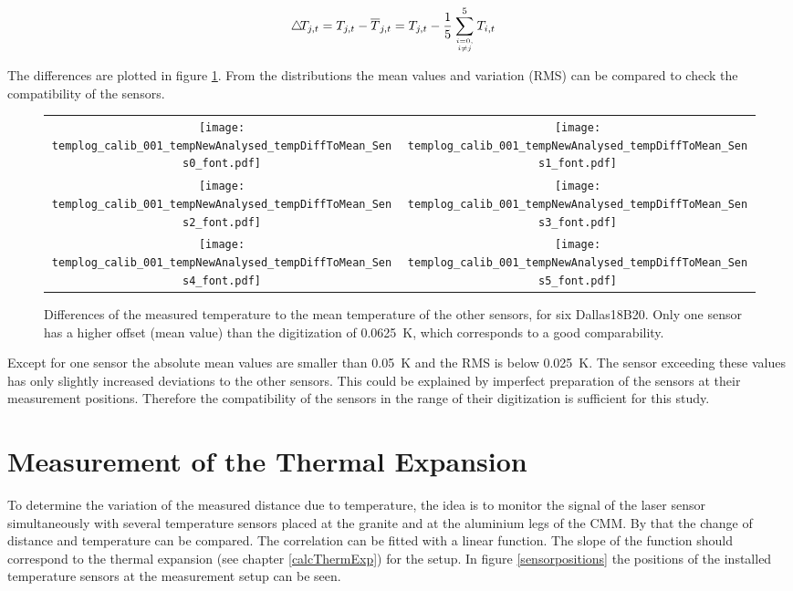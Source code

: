 \documentclass[
a4paper,                                %
twoside,                                %
BCOR1.4cm,                      %
10pt,                           %
headings=normal,                %
headsepline,                    %
clearplainpage, %
final,                                  %
div=14,
parskip=full,
openright,
bibliography=toc
]{scrreprt}
\begin{document}
\begin{align}
	\bigtriangleup\!T_{j,t} &= T_{j,t} - \overline{T}_{j,t} = T_{j,t} - \dfrac{1}{5}\sum_{i=0 ,\atop i\ne j}^{5} T_{i,t}
\end{align}

The differences are plotted in figure \ref{temphists}. From the distributions the mean values and variation (RMS) can be compared to check the compatibility of the sensors.

\begin{figure}[H]
	\begin{tabular}{cc}
		\texttt{[image: templog\_calib\_001\_tempNewAnalysed\_tempDiffToMean\_Sens0\_font.pdf]}
		&
		\texttt{[image: templog\_calib\_001\_tempNewAnalysed\_tempDiffToMean\_Sens1\_font.pdf]}
		\\
		\texttt{[image: templog\_calib\_001\_tempNewAnalysed\_tempDiffToMean\_Sens2\_font.pdf]}
		&
		\texttt{[image: templog\_calib\_001\_tempNewAnalysed\_tempDiffToMean\_Sens3\_font.pdf]}
		\\
		\texttt{[image: templog\_calib\_001\_tempNewAnalysed\_tempDiffToMean\_Sens4\_font.pdf]}
		&
		\texttt{[image: templog\_calib\_001\_tempNewAnalysed\_tempDiffToMean\_Sens5\_font.pdf]}
	\end{tabular}
	\caption{Differences of the measured temperature to the mean temperature of the other sensors, for six Dallas18B20. Only one sensor has a higher offset (mean value) than the digitization of \SI{0.0625}{K}, which corresponds to a good comparability.}
	\label{temphists}
\end{figure}

Except for one sensor the absolute mean values are smaller than \SI{0.05}{\K} and the RMS is below \SI{0.025}{\K}. The sensor exceeding these values has only slightly increased deviations to the other sensors. This could be explained by imperfect preparation of the sensors at their measurement positions. Therefore the compatibility of the sensors in the range of their digitization is sufficient for this study.

\newpage

\section{Measurement of the Thermal Expansion}

To determine the variation of the measured distance due to temperature, the idea is to monitor the signal of the laser sensor simultaneously with several temperature sensors placed at the granite and at the aluminium legs of the CMM. By that the change of distance and temperature can be compared. The correlation can be fitted with a linear function. The slope of the function should correspond to the thermal expansion (see chapter \ref{calcThermExp}) for the setup. In figure \ref{sensorpositions} the positions of the installed temperature sensors at the measurement setup can be seen.
\end{document}
